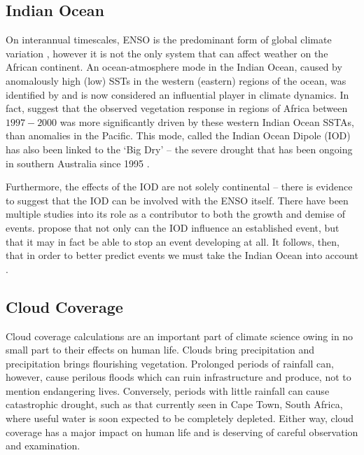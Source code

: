 \subsection{Indian Ocean}
On interannual timescales, ENSO is the predominant form of global climate
variation \citep{obrien1998}, however it is not the only system that can affect
weather on the African continent. An ocean-atmosphere mode in the Indian Ocean,
caused by anomalously high (low) SSTs in the western (eastern) regions of the
ocean, was identified by \cite{saji1999} and is now considered an influential
player in climate dynamics. In fact, \cite{anyamba2002} suggest that the
observed vegetation response in regions of Africa between $1997-2000$ was more
significantly driven by these western Indian Ocean SSTAs, than anomalies
in the Pacific. This mode, called the Indian Ocean Dipole (IOD) has also been
linked to the `Big Dry' -- the severe drought that has been ongoing in southern
Australia since 1995 \citep{karumuri2003, ummenhofer2009}.

Furthermore, the effects of the IOD are not solely continental -- there is
evidence to suggest that the IOD can be involved with the ENSO itself. There
have been multiple studies into its role as a contributor to both the growth
\citep{annamalai2005, hackert2017} and demise \citep{okumura2010, kug2006,
  xie2009, dayan2015} of \elnino{} events. \cite{dong2018} propose that not only
can the IOD influence an established \elnino{} event, but that it may in fact be
able to stop an \elnino{} event developing at all. It follows, then, that in
order to better predict \elnino{} events we must take the Indian Ocean into
account \citep{hackert2017}.

\subsection{Cloud Coverage}
\label{sec:intro:cc}
Cloud coverage calculations are an important part of climate science owing in no
small part to their effects on human life. Clouds bring precipitation and
precipitation brings flourishing vegetation. Prolonged periods of rainfall can,
however, cause perilous floods which can ruin infrastructure and produce, not to
mention endangering lives. Conversely, periods with little rainfall can cause
catastrophic drought, such as that currently seen in Cape Town, South Africa,
where useful water is soon expected to be completely depleted. Either way, cloud
coverage has a major impact on human life and is deserving of careful
observation and examination.


